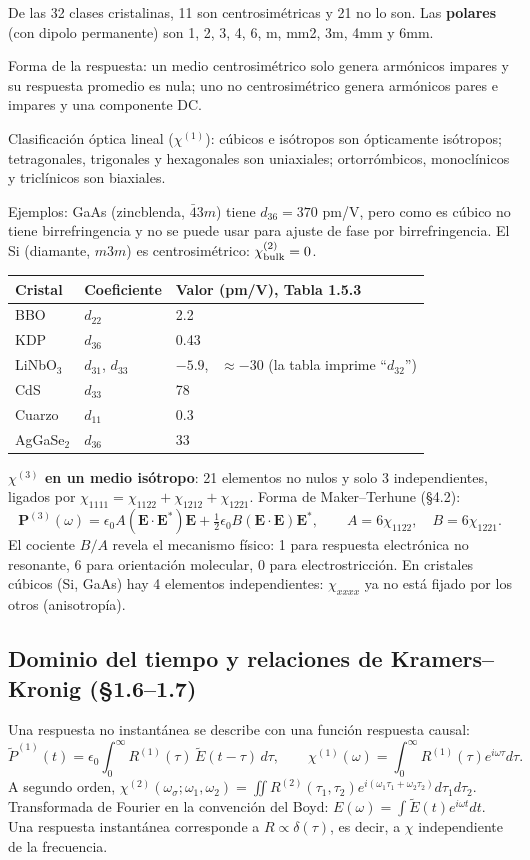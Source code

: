 \documentclass[10pt]{article}
\begin{document}
De las 32 clases cristalinas, 11 son centrosimétricas y 21 no lo son. Las \textbf{polares} (con dipolo permanente) son 1, 2, 3, 4, 6, m, mm2, 3m, 4mm y 6mm.

Forma de la respuesta: un medio centrosimétrico solo genera armónicos impares y su respuesta promedio es nula; uno no centrosimétrico genera armónicos pares e impares y una componente DC.

Clasificación óptica lineal ($\chi^{(1)}$): cúbicos e isótropos son ópticamente isótropos; tetragonales, trigonales y hexagonales son uniaxiales; ortorrómbicos, monoclínicos y triclínicos son biaxiales.

Ejemplos: GaAs (zincblenda, $\bar43m$) tiene $d_{36}=370$ pm/V, pero como es cúbico no tiene birrefringencia y no se puede usar para ajuste de fase por birrefringencia. El Si (diamante, $m3m$) es centrosimétrico: $\chi^{(2)}_{\rm bulk}=0$.

\begin{center}
\renewcommand{\arraystretch}{1.25}
\begin{tabular}{@{}lll@{}}
\toprule
Cristal & Coeficiente & Valor (pm/V), Tabla 1.5.3\\\midrule
BBO & $d_{22}$ & 2.2\\
KDP & $d_{36}$ & 0.43\\
LiNbO$_3$ & $d_{31}$, $d_{33}$ & $-5.9$, \ $\approx-30$ (la tabla imprime “$d_{32}$”)\\
CdS & $d_{33}$ & 78\\
Cuarzo & $d_{11}$ & 0.3\\
AgGaSe$_2$ & $d_{36}$ & 33\\
\bottomrule
\end{tabular}
\end{center}

\textbf{$\chi^{(3)}$ en un medio isótropo}: 21 elementos no nulos y solo 3 independientes, ligados por $\chi_{1111}=\chi_{1122}+\chi_{1212}+\chi_{1221}$. Forma de Maker–Terhune (§4.2):
\[
\mathbf P^{(3)}(\omega)=\epsilon_0A(\mathbf E\cdot\mathbf E^*)\mathbf E+\tfrac12\epsilon_0B(\mathbf E\cdot\mathbf E)\mathbf E^*,\qquad A=6\chi_{1122},\quad B=6\chi_{1221}.
\]
El cociente $B/A$ revela el mecanismo físico: 1 para respuesta electrónica no resonante, 6 para orientación molecular, 0 para electrostricción. En cristales cúbicos (Si, GaAs) hay 4 elementos independientes: $\chi_{xxxx}$ ya no está fijado por los otros (anisotropía).

\subsection{Dominio del tiempo y relaciones de Kramers–Kronig (§1.6–1.7)}
Una respuesta no instantánea se describe con una función respuesta causal:
\[
\tilde P^{(1)}(t)=\epsilon_0\int_0^\infty R^{(1)}(\tau)\,\tilde E(t-\tau)\,d\tau,\qquad \chi^{(1)}(\omega)=\int_0^\infty R^{(1)}(\tau)e^{i\omega\tau}d\tau .
\]
A segundo orden, $\chi^{(2)}(\omega_\sigma;\omega_1,\omega_2)=\iint R^{(2)}(\tau_1,\tau_2)e^{i(\omega_1\tau_1+\omega_2\tau_2)}d\tau_1d\tau_2$. Transformada de Fourier en la convención del Boyd: $E(\omega)=\int\tilde E(t)e^{i\omega t}dt$. Una respuesta instantánea corresponde a $R\propto\delta(\tau)$, es decir, a $\chi$ independiente de la frecuencia.
\end{document}
